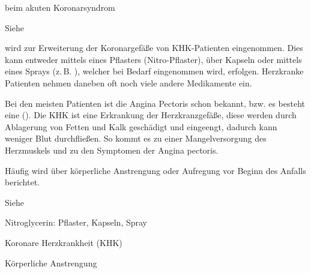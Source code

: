 \TextSlide
{{\TxSAMPLER} beim akuten Koronarsyndrom}
{
\begin{SAMPLERText}
  \item[\SAMPLER{S}] Siehe {\TxABCDE}
  \item[\SAMPLER{M}]  wird zur Erweiterung der
  Koronargefäße von KHK-Patienten eingenommen. Dies kann
  entweder mittels eines Pflasters (Nitro-Pflaster), über
  Kapseln oder mittels eines Sprays (z.\,B.
  ), welcher bei Bedarf
  eingenommen wird, erfolgen. 
  Herzkranke Patienten nehmen daneben oft noch viele andere Medikamente ein.
  \item[\SAMPLER{P}]
  Bei den meisten Patienten ist die Angina
  Pectoris schon bekannt, bzw. es besteht eine  (). Die KHK ist eine Erkrankung der
  Herzkranzgefäße, diese werden durch Ablagerung von Fetten
  und Kalk geschädigt und eingeengt, dadurch kann weniger Blut
  durchfließen. So kommt es zu einer Mangelversorgung des
  Herzmuskels und zu den Symptomen der Angina pectoris.
  \item[\SAMPLER{E}]
  Häufig wird über körperliche Anstrengung oder Aufregung
  vor Beginn des Anfalls berichtet.
\end{SAMPLERText}
}
{
\begin{SAMPLERSlide}
  \item[\SAMPLER{S}] Siehe {\TxABCDE}
%    
  \item[\SAMPLER{M}] Nitroglycerin: Pflaster, Kapseln, Spray
  \item[\SAMPLER{P}] Koronare Herzkrankheit (KHK)
  \item[\SAMPLER{E}] Körperliche Anstrengung
\end{SAMPLERSlide}
}

